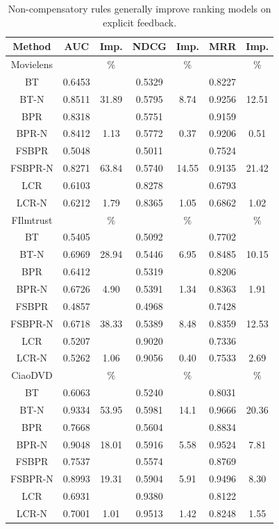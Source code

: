 \documentclass[letterpaper]{article} %
\begin{document}
\begin{table}[htp]
\caption{Non-compensatory rules generally improve ranking models on explicit feedback.}
\scriptsize
\begin{center}
\begin{tabular}{ccc|cc|cc}
\hline
 Method & AUC & Imp.& NDCG& Imp.& MRR &Imp. \\\hline
Movielens& & $\%$ & & $\%$ & & $\%$\\\hline
BT&0.6453 & & 0.5329 & & 0.8227 & \\
BT-N& 0.8511 & 31.89& 0.5795 & 8.74& 0.9256 & 12.51\\
BPR& 0.8318 & & 0.5751 & & 0.9159 & \\
BPR-N& 0.8412 & 1.13& 0.5772 & 0.37& 0.9206 & 0.51\\
FSBPR&0.5048 &	&	0.5011 &	&	0.7524 	&\\
FSBPR-N&	0.8271 &	63.84&	0.5740 &	14.55&	0.9135 &	21.42\\
LCR &0.6103& &0.8278 && 0.6793&\\ 
LCR-N &0.6212 &1.79 & 0.8365 &1.05 &0.6862 &1.02 \\
\hline
FIlmtrust& & $\%$ & & $\%$ & & $\%$\\\hline
BT& 0.5405 & & 0.5092 & & 0.7702 & \\
BT-N & 0.6969 & 28.94& 0.5446 & 6.95& 0.8485 & 10.15\\
BPR& 0.6412 & & 0.5319 & & 0.8206 & \\
BPR-N& 0.6726 & 4.90& 0.5391 & 1.34& 0.8363 & 1.91\\
FSBPR	&0.4857 		&&0.4968 		&&0.7428& 	 \\
FSBPR-N	&0.6718 &	38.33&	0.5389 &	8.48	&0.8359 	&12.53 \\
LCR &0.5207& &0.9020 && 0.7336&\\ 
LCR-N &0.5262 &1.06 & 0.9056 &0.40 &0.7533 &2.69 \\
\hline
CiaoDVD& & $\%$ & & $\%$ & & $\%$\\\hline
BT& 0.6063 & & 0.5240 & & 0.8031 & \\
BT-N& 0.9334 & 53.95& 0.5981 & 14.1& 0.9666 & 20.36\\
BPR& 0.7668 & & 0.5604 & & 0.8834 & \\
BPR-N& 0.9048 & 18.01& 0.5916 & 5.58& 0.9524 & 7.81\\
FSBPR 	&0.7537  	& 	&0.5574  	& 	&0.8769  	&\\
FSBPR-N 	&0.8993  	&19.31 	&0.5904  	&5.91 	&0.9496  	&8.30\\
LCR &0.6931& &0.9380 && 0.8122&\\ 
LCR-N &0.7001 &1.01& 0.9513 &1.42 &0.8248 &1.55 \\
\hline
\end{tabular}
\end{center}
\label{tab:rankingresult}
\end{table}
\end{document}
